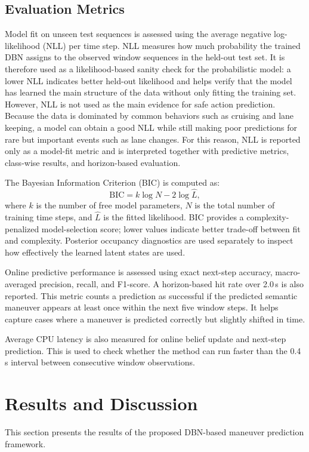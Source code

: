 \documentclass[upint,subscriptcorrection,varvw,hyphenate,balance,greek,russian,vietnamese,german]{asmeconf} %
\begin{document}
\subsection{Evaluation Metrics}
Model fit on unseen test sequences is assessed using the average negative log-likelihood (NLL) per time step. 
NLL measures how much probability the trained DBN assigns to the observed window sequences in the held-out test set. 
It is therefore used as a likelihood-based sanity check for the probabilistic model: a lower NLL indicates better held-out likelihood and helps verify that the model has learned the main structure of the data without only fitting the training set. 
However, NLL is not used as the main evidence for safe action prediction. 
Because the data is dominated by common behaviors such as cruising and lane keeping, a model can obtain a good NLL while still making poor predictions for rare but important events such as lane changes. 
For this reason, NLL is reported only as a model-fit metric and is interpreted together with predictive metrics, class-wise results, and horizon-based evaluation.

The Bayesian Information Criterion (BIC) is computed as:
\begin{equation}
\mathrm{BIC} = k \log N - 2 \log \hat{L},
\end{equation}
where $k$ is the number of free model parameters, $N$ is the total number of training time steps, and $\hat{L}$ is the fitted likelihood. 
BIC provides a complexity-penalized model-selection score; lower values indicate better trade-off between fit and complexity. 
Posterior occupancy diagnostics are used separately to inspect how effectively the learned latent states are used.

Online predictive performance is assessed using exact next-step accuracy, macro-averaged precision, recall, and F1-score. 
A horizon-based hit rate over 2.0\,s is also reported.  
This metric counts a prediction as successful if the predicted semantic maneuver appears at least once within the next five window steps. 
It helps capture cases where a maneuver is predicted correctly but slightly shifted in time. 

Average CPU latency is also measured for online belief update and next-step prediction. 
This is used to check whether the method can run faster than the 0.4\,s interval between consecutive window observations.

\section{Results and Discussion}
This section presents the results of the proposed DBN-based maneuver prediction framework. 
\end{document}
